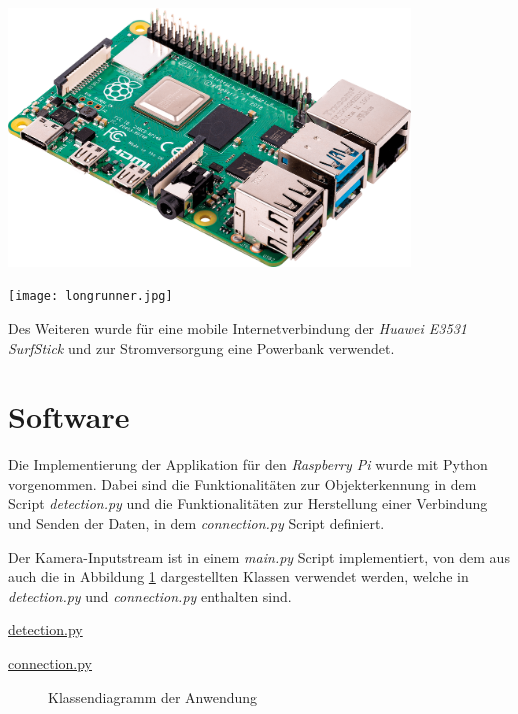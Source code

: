 \vspace{1cm}
\begin{minipage}{0.55\textwidth}
    \centering
    \includegraphics[width=0.8\textwidth]
    {./Bilder/raspberrypi_4.png}
    \label{fig:raspberrypi}
\end{minipage}
\begin{minipage}{0.45\textwidth}
    \centering
    \texttt{[image: longrunner.jpg]}
    \label{fig:rpicam}
\end{minipage}
\vspace{1cm}


Des Weiteren wurde für eine mobile Internetverbindung 
der \textit{Huawei E3531 SurfStick} und zur
 Stromversorgung eine Powerbank verwendet.


\section{Software}

Die Implementierung der Applikation für den \textit{Raspberry Pi}
wurde mit Python vorgenommen. 
Dabei sind die Funktionalitäten zur Objekterkennung in
dem Script \textit{detection.py} 
und die Funktionalitäten zur Herstellung einer Verbindung
und Senden der Daten, in dem 
\textit{connection.py} Script definiert.

Der Kamera-Inputstream ist in einem \textit{main.py} Script 
implementiert, von dem aus auch die in Abbildung 
\ref{fig:class_diagram} 
dargestellten Klassen verwendet werden,
welche in \textit{detection.py} und \textit{connection.py}
enthalten sind.
\vspace{1cm}

\begin{minipage}{0.75\textwidth}
    \centering
    \underline{detection.py}
\end{minipage}
\begin{minipage}{0.25\textwidth}
    \centering
    \underline{connection.py}
\end{minipage}
\begin{figure}[H]
    \centering
        
    \caption{Klassendiagramm der Anwendung}
    \label{fig:class_diagram}
\end{figure}
\vspace{1cm}


